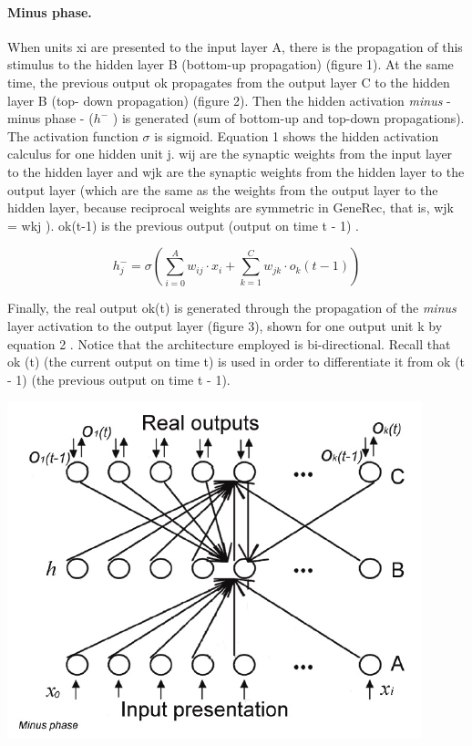 \paragraph{Minus phase.} When units xi are presented to the input layer A, there is the propagation of this stimulus to the hidden layer B (bottom-up propagation) (figure 1). At the same time, the previous output ok propagates from the output layer C to the hidden layer B (top- down propagation) (figure 2). Then the hidden activation \emph{minus} - minus phase - ($h^-$ ) is generated (sum of bottom-up and top-down propagations). The activation function $\sigma$ is sigmoid. Equation 1 shows the hidden activation calculus for one hidden unit j. wij are the synaptic weights from the input layer to the hidden layer and wjk are the synaptic weights from the hidden layer to the output layer (which are the same as the weights from the output layer to the hidden layer, because reciprocal weights are symmetric in GeneRec, that is, wjk = wkj \cite{o1996bio}). ok(t-1) is the previous output (output on time t - 1) \cite{orru2008sabio}.

$$h_j^- = \sigma \left(\sum_{i=0}^A w_{ij} \cdot x_i + \sum_{k=1}^C w_{jk} \cdot o_k(t-1)\right)$$

Finally, the real output ok(t) is generated through the propagation of the \emph{minus} layer activation to the output layer (figure 3), shown for one output unit k by equation 2 \cite{o1996bio}. Notice that the architecture employed is bi-directional. Recall that ok (t) (the current output on time t) is used in order to differentiate it from ok (t - 1) (the previous output on time t - 1).

\begin{center} 
\includegraphics{img/generec_minus_phase.png} \cite{orru2008sabio} 
\end{center} 

